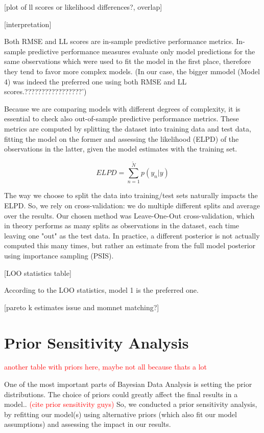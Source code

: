 \documentclass[12pt]{article}
\begin{document}
[plot of ll scores or likelihood differences?, overlap]

[interpretation]



Both RMSE and LL scores are in-sample predictive performance metrics. In-sample predictive performance measures evaluate only model predictions for the same observations which were used to fit the model in the first place, therefore they tend to favor more complex models.
(In our case, the bigger mmodel (Model 4) was indeed the preferred one using both RMSE and LL scores.?????????????????')

Because we are comparing models with different degrees of complexity, it is essential to check also out-of-sample predictive performance metrics. These metrics are computed by splitting the dataset into training data and test data, fitting the model on the former and assessing the likelihood (ELPD) of the observations in the latter, given the model estimates with the training set.

\begin{equation}
	ELPD = \sum_{n= 1}^{\tilde{N}} p(\hat{y_n} | y)
\end{equation}

The way we choose to split the data into training/test sets naturally impacts the ELPD. So, we rely on cross-validation: we do multiple different splits and average over the results. Our chosen method was Leave-One-Out cross-validation, which in theory performs as many splits as observations in the dataset, each time leaving one "out" as the test data. In practice, a different posterior is not actually computed this many times, but rather an estimate from the full model posterior using importance sampling (PSIS).

[LOO statistics table]

According to the LOO statistics, model 1 is the preferred one.

[pareto k estimates issue and momnet matching?]


\section{Prior Sensitivity Analysis}

\textcolor{red}{another table with priors here, maybe not all because thats a lot}

One of the most important parts of Bayesian Data Analysis is setting the prior distributions. The choice of priors could greatly affect the final results in a model..  \textcolor{red}{(cite prior sensitivity guys)}
So, we conducted a prior sensitivity analysis, by refitting our model(s) using alternative priors (which also fit our model assumptions) and assessing the impact in our results.
\end{document}
